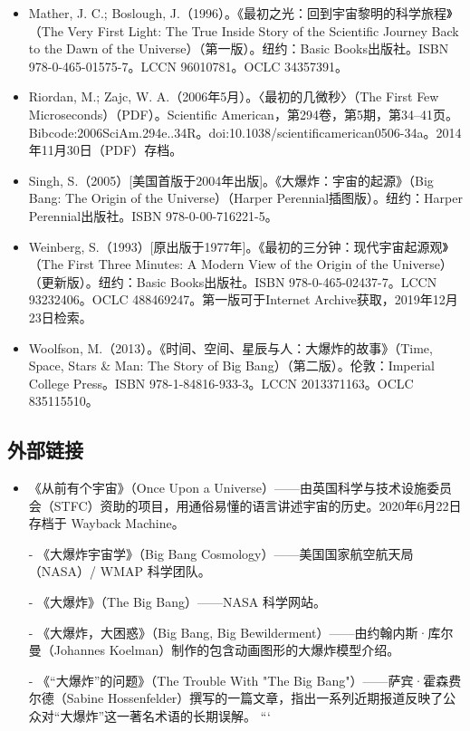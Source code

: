 \begin{itemize}
\item Mather, J. C.; Boslough, J.（1996）。《最初之光：回到宇宙黎明的科学旅程》（The Very First Light: The True Inside Story of the Scientific Journey Back to the Dawn of the Universe）（第一版）。纽约：Basic Books出版社。ISBN 978-0-465-01575-7。LCCN 96010781。OCLC 34357391。  
\item Riordan, M.; Zajc, W. A.（2006年5月）。〈最初的几微秒〉（The First Few Microseconds）（PDF）。Scientific American，第294卷，第5期，第34–41页。Bibcode:2006SciAm.294e..34R。doi:10.1038/scientificamerican0506-34a。2014年11月30日（PDF）存档。  
\item Singh, S.（2005）[美国首版于2004年出版]。《大爆炸：宇宙的起源》（Big Bang: The Origin of the Universe）（Harper Perennial插图版）。纽约：Harper Perennial出版社。ISBN 978-0-00-716221-5。  
\item Weinberg, S.（1993）[原出版于1977年]。《最初的三分钟：现代宇宙起源观》（The First Three Minutes: A Modern View of the Origin of the Universe）（更新版）。纽约：Basic Books出版社。ISBN 978-0-465-02437-7。LCCN 93232406。OCLC 488469247。第一版可于Internet Archive获取，2019年12月23日检索。 
\item Woolfson, M.（2013）。《时间、空间、星辰与人：大爆炸的故事》（Time, Space, Stars & Man: The Story of Big Bang）（第二版）。伦敦：Imperial College Press。ISBN 978-1-84816-933-3。LCCN 2013371163。OCLC 835115510。  
\end{itemize}
\subsection{外部链接}
\begin{itemize}
\item 《从前有个宇宙》（Once Upon a Universe）——由英国科学与技术设施委员会（STFC）资助的项目，用通俗易懂的语言讲述宇宙的历史。2020年6月22日存档于 Wayback Machine。  

- 《大爆炸宇宙学》（Big Bang Cosmology）——美国国家航空航天局（NASA）/ WMAP 科学团队。  

- 《大爆炸》（The Big Bang）——NASA 科学网站。  

- 《大爆炸，大困惑》（Big Bang, Big Bewilderment）——由约翰内斯·库尔曼（Johannes Koelman）制作的包含动画图形的大爆炸模型介绍。  

- 《“大爆炸”的问题》（The Trouble With "The Big Bang"）——萨宾·霍森费尔德（Sabine Hossenfelder）撰写的一篇文章，指出一系列近期报道反映了公众对“大爆炸”这一著名术语的长期误解。  
```

\end{itemize}






